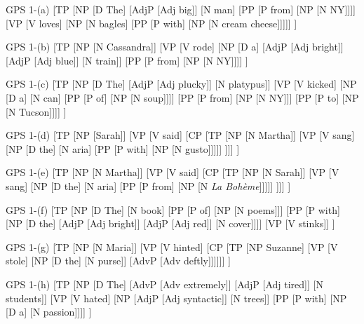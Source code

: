 \documentclass{article}
\begin{document}
\bigskip
\noindent
\begin{gpstree}[\textwidth]{GPS 1-(a)}
[TP
  [NP [D The] [AdjP [Adj big]] [N man] [PP [P from] [NP [N NY]]]]
  [VP [V loves] [NP [N bagles] [PP [P with] [NP [N {cream cheese}]]]]]
] 
\end{gpstree}

\bigskip
\noindent
\begin{gpstree}[\textwidth]{GPS 1-(b)}
[TP
  [NP [N Cassandra]]
  [VP [V rode] [NP [D a] [AdjP [Adj bright]] [AdjP [Adj blue]] [N train]] [PP [P from] [NP [N NY]]]]
] 
\end{gpstree}

\bigskip
\noindent
\begin{gpstree}[\textwidth]{GPS 1-(c)}
[TP
  [NP [D The] [AdjP [Adj plucky]] [N platypus]]
  [VP [V kicked] [NP [D a] [N can] [PP [P of] [NP [N soup]]]] [PP [P from] [NP [N NY]]] [PP [P to] [NP [N Tucson]]]]
] 
\end{gpstree}

\bigskip
\noindent
\begin{gpstree}{GPS 1-(d)}
[TP
  [NP [Sarah]]
  [VP [V said] [CP
    [TP 
      [NP [N Martha]]
      [VP [V sang] [NP [D the] [N aria] [PP [P with] [NP [N gusto]]]]]
  ]]]
] 
\end{gpstree}
\hfill
\bigskip
\noindent
\begin{gpstree}{GPS 1-(e)}
[TP
  [NP [N Martha]]
  [VP [V said] [CP 
    [TP 
      [NP [N Sarah]]
      [VP [V sang] [NP [D the] [N aria] [PP [P from] [NP [N {\textit{La Boh\`eme}}]]]]]
  ]]]
] 
\end{gpstree}

\bigskip
\noindent
\begin{gpstree}{GPS 1-(f)}
[TP
  [NP [D The] [N book] [PP [P of] [NP [N poems]]] [PP [P with] [NP [D the] [AdjP [Adj bright]] [AdjP [Adj red]] [N cover]]]]
  [VP [V stinks]]
]
\end{gpstree}
\hfill
\noindent
\begin{gpstree}{GPS 1-(g)}
[TP
  [NP [N Maria]]
  [VP [V hinted] [CP [TP [NP Suzanne] [VP [V stole] [NP [D the] [N purse]] [AdvP [Adv deftly]]]]]]
]
\end{gpstree}

\bigskip
\noindent
\begin{gpstree}[\textwidth]{GPS 1-(h)}
[TP
  [NP [D The] [AdvP [Adv extremely]] [AdjP [Adj tired]] [N students]]
  [VP [V hated] [NP [AdjP [Adj syntactic]] [N trees]] [PP [P with] [NP [D a] [N passion]]]]
]
\end{gpstree}  
\end{document}

